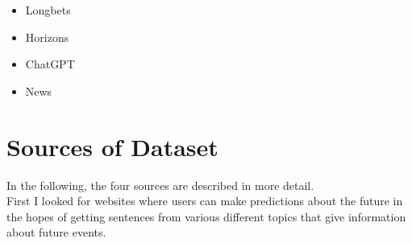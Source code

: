\documentclass[a4paper,12pt]{report} %
\begin{document}
\begin{itemize}
  \item Longbets
  \item Horizons
  \item ChatGPT
  \item News
\end{itemize}


\section{Sources of Dataset}
In the following, the four sources are described in more detail. \\
First I looked for websites where users can make predictions about the future in the hopes of getting sentences from various different topics that give information about future events.
\end{document}
